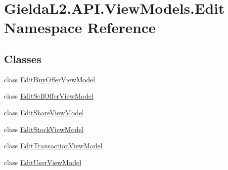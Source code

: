 \hypertarget{namespace_gielda_l2_1_1_a_p_i_1_1_view_models_1_1_edit}{}\section{Gielda\+L2.\+A\+P\+I.\+View\+Models.\+Edit Namespace Reference}
\label{namespace_gielda_l2_1_1_a_p_i_1_1_view_models_1_1_edit}
\subsection*{Classes}
\begin{DoxyCompactItemize}
\item 
class \mbox{\hyperlink{class_gielda_l2_1_1_a_p_i_1_1_view_models_1_1_edit_1_1_edit_buy_offer_view_model}{Edit\+Buy\+Offer\+View\+Model}}
\item 
class \mbox{\hyperlink{class_gielda_l2_1_1_a_p_i_1_1_view_models_1_1_edit_1_1_edit_sell_offer_view_model}{Edit\+Sell\+Offer\+View\+Model}}
\item 
class \mbox{\hyperlink{class_gielda_l2_1_1_a_p_i_1_1_view_models_1_1_edit_1_1_edit_share_view_model}{Edit\+Share\+View\+Model}}
\item 
class \mbox{\hyperlink{class_gielda_l2_1_1_a_p_i_1_1_view_models_1_1_edit_1_1_edit_stock_view_model}{Edit\+Stock\+View\+Model}}
\item 
class \mbox{\hyperlink{class_gielda_l2_1_1_a_p_i_1_1_view_models_1_1_edit_1_1_edit_transaction_view_model}{Edit\+Transaction\+View\+Model}}
\item 
class \mbox{\hyperlink{class_gielda_l2_1_1_a_p_i_1_1_view_models_1_1_edit_1_1_edit_user_view_model}{Edit\+User\+View\+Model}}
\end{DoxyCompactItemize}
